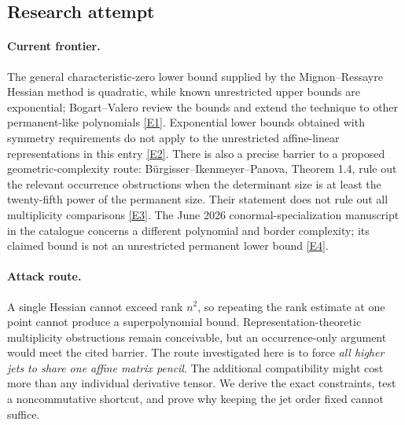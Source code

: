 \documentclass[11pt,a4paper]{article}
\newcommand{\eref}[2]{\hyperlink{extra:#1:#2}{[E#2]}}
\numberwithin{equation}{section}
\begin{document}
\subsection{Research attempt}

\paragraph{Current frontier.}
The general characteristic-zero lower bound supplied by the Mignon--Ressayre Hessian method is quadratic, while known unrestricted upper bounds are exponential; Bogart--Valero review the bounds and extend the technique to other permanent-like polynomials \eref{30006699}{1}. Exponential lower bounds obtained with symmetry requirements do not apply to the unrestricted affine-linear representations in this entry \eref{30006699}{2}. There is also a precise barrier to a proposed geometric-complexity route: B\"urgisser--Ikenmeyer--Panova, Theorem 1.4, rule out the relevant occurrence obstructions when the determinant size is at least the twenty-fifth power of the permanent size. Their statement does not rule out all multiplicity comparisons \eref{30006699}{3}. The June 2026 conormal-specialization manuscript in the catalogue concerns a different polynomial and border complexity; its claimed bound is not an unrestricted permanent lower bound \eref{30006699}{4}.

\paragraph{Attack route.}
A single Hessian cannot exceed rank $n^2$, so repeating the rank estimate at one point cannot produce a superpolynomial bound. Representation-theoretic multiplicity obstructions remain conceivable, but an occurrence-only argument would meet the cited barrier. The route investigated here is to force \emph{all higher jets to share one affine matrix pencil}. The additional compatibility might cost more than any individual derivative tensor. We derive the exact constraints, test a noncommutative shortcut, and prove why keeping the jet order fixed cannot suffice.
\end{document}
